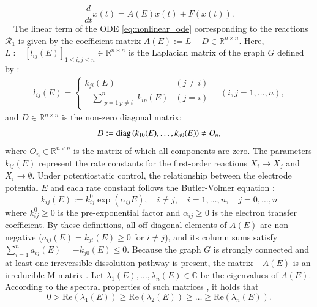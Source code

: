 \documentclass[11pt,a4paper]{article}
\begin{document}
\begin{equation}
\frac{d}{dt}x(t) = A(E)x(t) + F(x(t)). \label{eq:nonlinear_ode}
\end{equation}
~~The linear term of the ODE \eqref{eq:nonlinear_ode} corresponding to the reactions $\mathcal{R}_1$ is given by the coefficient matrix $A(E) := L - D \in \mathbb{R}^{n \times n}$. Here, $L := [ l_{ij}(E) ]_{1 \le i,j \le n} \in {\mathbb R}^{n \times n}$ is the Laplacian matrix of the graph $G$ defined by \cite{Mirzaev-2013,Mirzaev-2015}:
\begin{align}
l_{ij}(E) = \left \{
\begin{array}{ll}
k_{ji}(E) & ( j \neq i)\\[0.1cm]
-\sum_{\substack{p=1 \ p \neq i}}^n k_{ip}(E) & (j = i)
\end{array}\right.
\quad (i,j = 1,\ldots,n), \label{eq:laplacian}
\end{align}
and $D \in {\mathbb R}^{n \times n}$ is the non-zero diagonal matrix:
\begin{align}
D:={\rm diag}\left(k_{10}(E), \ldots,k_{n0}(E)\right) \neq O_n, \label{eq:dissolution_matrix}
\end{align}
where $O_n \in {\mathbb R}^{n \times n}$ is the matrix of which all components are zero. The parameters $k_{ij}(E)$ represent the rate constants for the first-order reactions $X_i \to X_j$ and $X_i \to \emptyset$. Under potentiostatic control, the relationship between the electrode potential $E$ and each rate constant follows the Butler-Volmer equation \cite{Bard}:
\begin{equation}
k_{ij}(E) := k_{ij}^0 \exp(\alpha_{ij} E), \quad i \neq j, \quad i=1,\ldots,n, \quad j=0,\ldots,n \label{eq:BV}
\end{equation}
where $k_{ij}^0 \ge 0$ is the pre-exponential factor and $\alpha_{ij} \ge 0$ is the electron transfer coefficient. By these definitions, all off-diagonal elements of $A(E)$ are non-negative ($a_{ij}(E) = k_{ji}(E) \ge 0$ for $i \neq j$), and its column sums satisfy $\sum_{i=1}^n a_{ij}(E) = -k_{j0}(E) \le 0$. Because the graph $G$ is strongly connected and at least one irreversible dissolution pathway is present, the matrix $-A(E)$ is an irreducible M-matrix \cite{Francesco,Hofbauer-2000}. Let $\lambda_1(E), \dots, \lambda_n(E) \in \mathbb{C}$ be the eigenvalues of $A(E)$. According to the spectral properties of such matrices \cite{Hofbauer-2000,Mirzaev-2013,Mirzaev-2015}, it holds that
\begin{equation}
0 > \mathrm{Re}(\lambda_1(E)) \ge \mathrm{Re}(\lambda_2(E)) \ge \dots \ge \mathrm{Re}(\lambda_n(E)). \label{eq:eigenvalues}
\end{equation}
\end{document}
